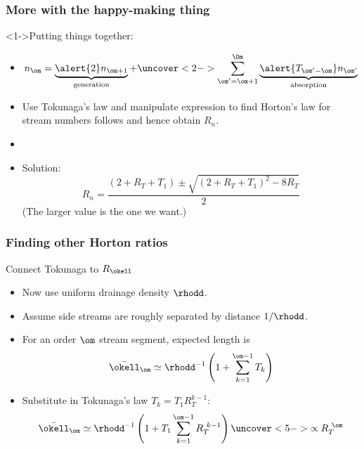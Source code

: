 \begin{frame}[label=]
  \frametitle{More with the happy-making thing}

  \begin{block}<1->{Putting things together:}
    \begin{itemize}
    \item<1->
      $$
      n_\om
      =
      \underbrace{\alert{2}n_{\om+1}}_{\textnormal{generation}}
      +
      \uncover<2->{
      \sum_{\om'=\om+1}^{\Om}
      \underbrace{\alert{T_{\om'-\om}} n_{\om'}}_{\textnormal{absorption}}
      }
      $$
    \item<3->
      Use Tokunaga's law and manipulate expression
      to find Horton's law for stream numbers follows
      and hence obtain $R_n$.
    \item<3->
    \item<4->
      Solution:
      $$
      R_n
      =
      \frac{
      (2+R_T+T_1)
      \pm 
      \sqrt{
        (2+R_T+T_1)^2-8R_T
        }
      }
      {2}
      $$
      (The larger value is the one we want.)
    \end{itemize}
  \end{block}

\end{frame}


\begin{frame}[label=]
  \frametitle{Finding other Horton ratios}

  \begin{block}{Connect Tokunaga to $R_\okell$}
    \begin{itemize}
    \item<1-> 
      Now use uniform drainage density $\rhodd$.
    \item<2-> 
      Assume side streams are roughly separated
      by distance $1/\rhodd$.
    \item<3-> For an order $\om$ \alert{stream segment},
      expected length is 
      $$
      \bar{\okell}_\om
      \simeq
      \rhodd^{-1}
      \left(
        1 + \sum_{k=1}^{\om-1} T_k
      \right)
      $$
    \item<4-> Substitute in Tokunaga's law $T_k = T_1 R_T^{k-1}$:
      $$
      \bar{\okell}_\om
      \simeq
      \rhodd^{-1}
      \left(
        1 + T_1 \sum_{k=1}^{\om-1} R_T^{\ k-1}
      \right)
      \uncover<5->{
      \propto
      R_T^{\ \om}
      }
      $$
    \end{itemize}
  \end{block}

\end{frame}

